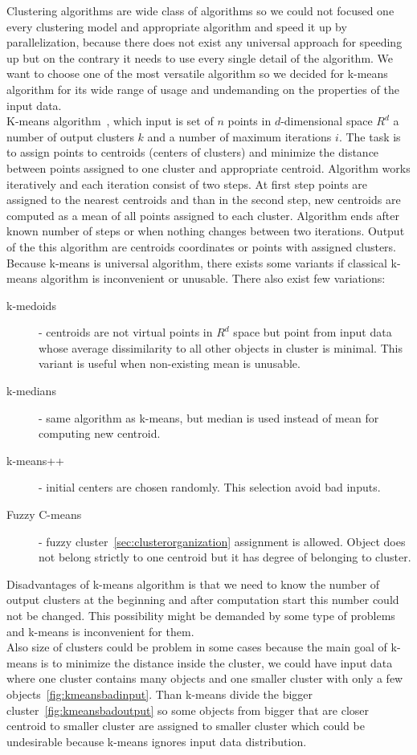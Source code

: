 Clustering algorithms are wide class of algorithms so we could not focused one every clustering model and appropriate algorithm and speed it up by parallelization, because there does not exist any universal approach for speeding up but on the contrary it needs to use every single detail of the algorithm. We want to choose one of the most versatile algorithm so we decided for k-means algorithm for its wide range of usage and undemanding on the properties of the input data.\\
K-means algorithm~\cite{hartigan1979algorithm}, which input is set of $n$ points in $d$-dimensional space $R^d$ a number of output clusters $k$ and a number of maximum iterations $i$. The task is to assign points to centroids (centers of clusters) and minimize the distance between points assigned to one cluster and appropriate centroid. Algorithm works iteratively and each iteration consist of two steps. At first step points are assigned to the nearest centroids and than in the second step, new centroids are computed as a mean of all points assigned to each cluster. Algorithm ends after known number of steps or when nothing changes between two iterations. Output of the this algorithm are centroids coordinates or points with assigned clusters.
Because k-means is universal algorithm, there exists some variants if classical k-means algorithm is inconvenient or unusable.
There also exist few variations:
\begin{description}
\item[k-medoids] - centroids are not virtual points in $R^d$ space but point from input data whose average dissimilarity to all other objects in cluster is minimal. This variant is useful when non-existing mean is unusable.
\item[k-medians] - same algorithm as k-means, but median is used instead of mean for computing new centroid.
\item[k-means++] - initial centers are chosen randomly. This selection avoid bad inputs.
\item[Fuzzy C-means] - fuzzy cluster~\ref{sec:clusterorganization} assignment is allowed. Object does not belong strictly to one centroid but it has degree of belonging to cluster.
\end{description}

Disadvantages of k-means algorithm is that we need to know the number of output clusters at the beginning and after computation start this number could not be changed. This possibility might be demanded by some type of problems and k-means is inconvenient for them.\\
Also size of clusters could be problem in some cases because the main goal of k-means is to minimize the distance inside the cluster, we could have input data where one cluster contains many objects and one smaller cluster with only a few objects~\autoref{fig:kmeansbadinput}. Than k-means divide the bigger cluster~\autoref{fig:kmeansbadoutput} so some objects from bigger that are closer centroid to smaller cluster are assigned to smaller cluster which could be undesirable because k-means ignores input data distribution.

